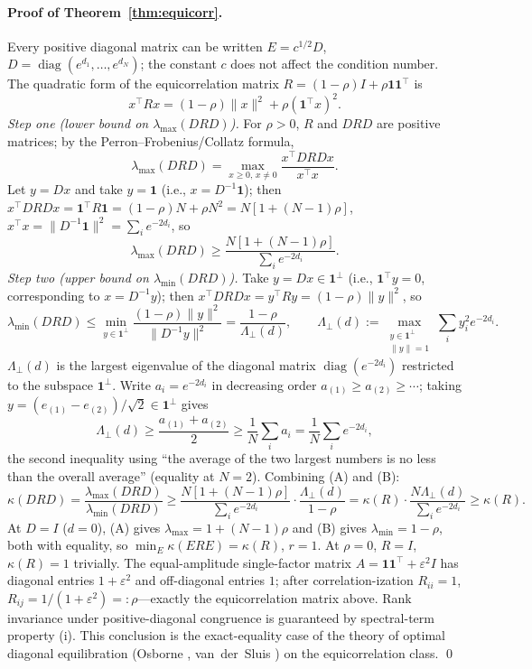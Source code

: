 \documentclass[11pt]{article}
\DeclareMathOperator{\diag}{diag}
\numberwithin{equation}{section}
\begin{document}
\paragraph{Proof of Theorem~\ref{thm:equicorr}.}
Every positive diagonal matrix can be written $E=c^{1/2}D$, $D=\diag(e^{d_1},\dots,e^{d_N})$; the constant $c$ does not affect the condition number. The quadratic form of the equicorrelation matrix $R=(1-\rho)I+\rho\mathbf 1\mathbf 1^\top$ is
\[
x^\top R x=(1-\rho)\|x\|^2+\rho(\mathbf 1^\top x)^2.
\]
\emph{Step one (lower bound on $\lambda_{\max}(DRD)$).} For $\rho>0$, $R$ and $DRD$ are positive matrices; by the Perron--Frobenius/Collatz formula,
\[
\lambda_{\max}(DRD)=\max_{x\ge0,\,x\ne0}\frac{x^\top DRD x}{x^\top x}.
\]
Let $y=Dx$ and take $y=\mathbf 1$ (i.e., $x=D^{-1}\mathbf 1$); then $x^\top DRD x=\mathbf 1^\top R\mathbf 1=(1-\rho)N+\rho N^2=N[1+(N-1)\rho]$, $x^\top x=\|D^{-1}\mathbf 1\|^2=\sum_i e^{-2d_i}$, so
\[
\lambda_{\max}(DRD)\ge\frac{N[1+(N-1)\rho]}{\sum_i e^{-2d_i}}. \tag{A}
\]
\emph{Step two (upper bound on $\lambda_{\min}(DRD)$).} Take $y=Dx\in\mathbf 1^\perp$ (i.e., $\mathbf 1^\top y=0$, corresponding to $x=D^{-1}y$); then $x^\top DRD x=y^\top R y=(1-\rho)\|y\|^2$, so
\[
\lambda_{\min}(DRD)\le\min_{y\in\mathbf 1^\perp}\frac{(1-\rho)\|y\|^2}{\|D^{-1}y\|^2}
=\frac{1-\rho}{\Lambda_\perp(d)},\qquad
\Lambda_\perp(d):=\max_{\substack{y\in\mathbf 1^\perp\\ \|y\|=1}}\sum_i y_i^2 e^{-2d_i}. \tag{B}
\]
$\Lambda_\perp(d)$ is the largest eigenvalue of the diagonal matrix $\diag(e^{-2d_i})$ restricted to the subspace $\mathbf 1^\perp$. Write $a_i=e^{-2d_i}$ in decreasing order $a_{(1)}\ge a_{(2)}\ge\cdots$; taking $y=(e_{(1)}-e_{(2)})/\sqrt2\in\mathbf 1^\perp$ gives
\[
\Lambda_\perp(d)\ge\frac{a_{(1)}+a_{(2)}}2\ge\frac1N\sum_i a_i=\frac1N\sum_i e^{-2d_i},
\]
the second inequality using ``the average of the two largest numbers is no less than the overall average'' (equality at $N=2$). Combining (A) and (B):
\[
\kappa(DRD)=\frac{\lambda_{\max}(DRD)}{\lambda_{\min}(DRD)}
\ge\frac{N[1+(N-1)\rho]}{\sum_i e^{-2d_i}}\cdot\frac{\Lambda_\perp(d)}{1-\rho}
=\kappa(R)\cdot\frac{N\Lambda_\perp(d)}{\sum_i e^{-2d_i}}\ge\kappa(R).
\]
At $D=I$ ($d=0$), (A) gives $\lambda_{\max}=1+(N-1)\rho$ and (B) gives $\lambda_{\min}=1-\rho$, both with equality, so $\min_E\kappa(ERE)=\kappa(R)$, $r=1$. At $\rho=0$, $R=I$, $\kappa(R)=1$ trivially. The equal-amplitude single-factor matrix $A=\mathbf 1\mathbf 1^\top+\varepsilon^2 I$ has diagonal entries $1+\varepsilon^2$ and off-diagonal entries $1$; after correlation-ization $R_{ii}=1$, $R_{ij}=1/(1+\varepsilon^2)=:\rho$---exactly the equicorrelation matrix above. Rank invariance under positive-diagonal congruence is guaranteed by spectral-term property (i). This conclusion is the exact-equality case of the theory of optimal diagonal equilibration (Osborne \cite{Osborne1960}, van~der~Sluis \cite{vanderSluis1969}) on the equicorrelation class. \qed
\end{document}
